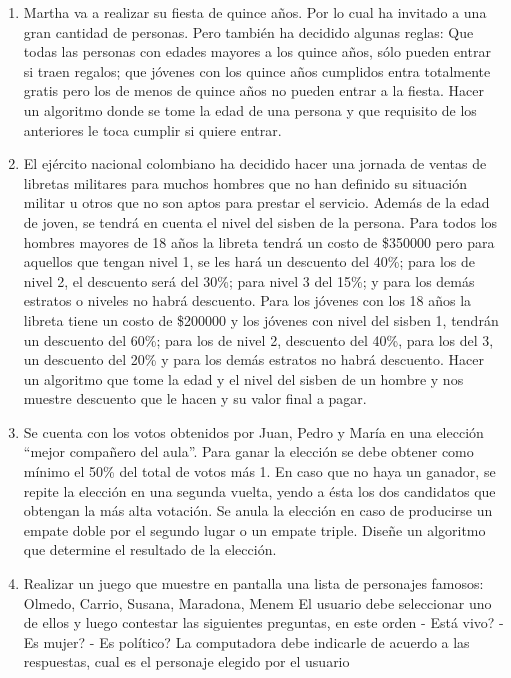 \begin{enumerate}[resume]
  \item Martha va a realizar su fiesta de quince años. Por lo cual
    ha invitado a una gran cantidad de personas. Pero también ha decidido
    algunas reglas: Que todas las personas con edades mayores a los quince
    años, sólo pueden entrar si traen regalos; que jóvenes con los quince años
    cumplidos entra totalmente gratis pero los de menos de quince años no
    pueden entrar a la fiesta. Hacer un algoritmo donde se tome la edad de una
    persona y que requisito de los anteriores le toca cumplir si quiere entrar.
     
  \item El ejército nacional colombiano ha decidido hacer una
    jornada de ventas de libretas militares para muchos hombres que no han
    definido su situación militar u otros que no son aptos para prestar el
    servicio. Además de la edad de joven, se tendrá en cuenta el nivel del
    sisben de la persona. Para todos los hombres mayores de 18 años la libreta
    tendrá un costo de \$350000 pero para aquellos que tengan nivel 1, se les
    hará un descuento del 40\%; para los de nivel 2, el descuento será del 30\%;
    para nivel 3 del 15\%; y para los demás estratos o niveles no habrá
    descuento. Para los jóvenes con los 18 años la libreta tiene un costo de
    \$200000 y los jóvenes con nivel del sisben 1, tendrán un descuento del 60\%;
    para los de nivel 2, descuento del 40\%, para los del 3, un descuento del
    20\% y para los demás estratos no habrá descuento. Hacer un algoritmo que
    tome la edad y el nivel del sisben de un hombre y nos muestre descuento que
    le hacen y su valor final a pagar.
     
  \item Se cuenta con los votos obtenidos por Juan, Pedro y María
    en una elección “mejor compañero del aula”. Para ganar la elección se debe
    obtener como mínimo el  50\% del total de votos más 1.
    En caso que no haya un ganador, se repite la elección en una  segunda
    vuelta, yendo a ésta los dos candidatos que obtengan la más alta votación.
    Se anula la  elección en caso de producirse un empate doble por el segundo
    lugar o un empate triple.
    Diseñe  un algoritmo que determine el resultado de la elección.
     
  \item Realizar un juego  que muestre en pantalla una lista de
    personajes famosos:
    Olmedo, Carrio, Susana, Maradona, Menem
    El usuario debe seleccionar uno de ellos y luego contestar las siguientes
    preguntas, en este orden
    -          Está vivo?
    -          Es mujer?
    -          Es político?
    La computadora debe indicarle de acuerdo a las respuestas, cual es el
    personaje elegido por el usuario
 

\end{enumerate}

